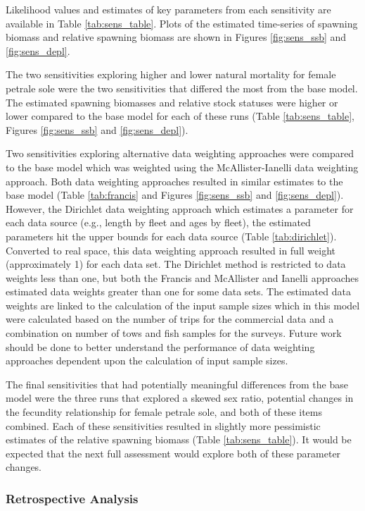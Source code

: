 \documentclass[12pt,]{article}
\begin{document}
Likelihood values and estimates of key parameters from each sensitivity
are available in Table \ref{tab:sens_table}. Plots of the estimated
time-series of spawning biomass and relative spawning biomass are shown
in Figures \ref{fig:sens_ssb} and \ref{fig:sens_depl}.

The two sensitivities exploring higher and lower natural mortality for
female petrale sole were the two sensitivities that differed the most
from the base model. The estimated spawning biomasses and relative stock
statuses were higher or lower compared to the base model for each of
these runs (Table \ref{tab:sens_table}, Figures \ref{fig:sens_ssb} and
\ref{fig:sens_depl}).

Two sensitivities exploring alternative data weighting approaches were
compared to the base model which was weighted using the
McAllister-Ianelli data weighting approach. Both data weighting
approaches resulted in similar estimates to the base model (Table
\ref{tab:francis} and Figures \ref{fig:sens_ssb} and
\ref{fig:sens_depl}). However, the Dirichlet data weighting approach
which estimates a parameter for each data source (e.g., length by fleet
and ages by fleet), the estimated parameters hit the upper bounds for
each data source (Table \ref{tab:dirichlet}). Converted to real space,
this data weighting approach resulted in full weight (approximately 1)
for each data set. The Dirichlet method is restricted to data weights
less than one, but both the Francis and McAllister and Ianelli
approaches estimated data weights greater than one for some data sets.
The estimated data weights are linked to the calculation of the input
sample sizes which in this model were calculated based on the number of
trips for the commercial data and a combination on number of tows and
fish samples for the surveys. Future work should be done to better
understand the performance of data weighting approaches dependent upon
the calculation of input sample sizes.

The final sensitivities that had potentially meaningful differences from
the base model were the three runs that explored a skewed sex ratio,
potential changes in the fecundity relationship for female petrale sole,
and both of these items combined. Each of these sensitivities resulted
in slightly more pessimistic estimates of the relative spawning biomass
(Table \ref{tab:sens_table}). It would be expected that the next full
assessment would explore both of these parameter changes.

\subsubsection{Retrospective Analysis}\label{retrospective-analysis}
\end{document}
